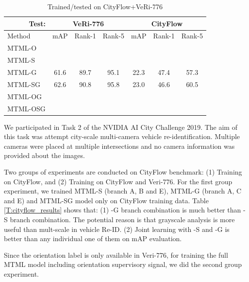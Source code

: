 \documentclass[10pt,twocolumn,letterpaper]{article}
\begin{document}
\begin{table}[h]
  \centering
  \setlength{\tabcolsep}{0.05cm}
  \begin{tabular}{l|c|c|c|c|c|c}
  \hline
  \multicolumn{1}{r|}{Test:} & \multicolumn{3}{c|}{VeRi-776} & \multicolumn{3}{c}{CityFlow} \\
  \hline
  Method       & mAP   & Rank-1  & Rank-5  & mAP   & Rank-1 & Rank-5  \\
  \hline
  MTML-O       &       &         &         &       &        &         \\
  MTML-S       &       &         &         &       &        &         \\
  MTML-G       & 61.6  & 89.7    & 95.1    & 22.3  & 47.4   & 57.3   \\
  MTML-SG      & 62.6  & 90.8    & 95.8    & 23.0  & 46.6   & 60.5   \\
  MTML-OG      &       &         &         &       &        &         \\
  MTML-OSG     &       &         &         &       &        &      \\
  \hline
  \end{tabular}
  \caption{Trained/tested on CityFlow+VeRi-776}
  \label{T:cf_veri_res}
\end{table}

We participated in Task 2 of the NVIDIA AI City Challenge 2019. The aim of this task was attempt city-scale multi-camera vehicle re-identification. Multiple cameras were placed at multiple intersections and no camera information was provided about the images.

Two groups of experiments are conducted on CityFlow benchmark: 
(1) Training on CityFlow, and (2) Training on CityFlow and Veri-776.
%
For the first group experiment, we trained MTML-S (branch A, B and E), 
MTML-G (branch A, C and E) and MTML-SG model only on CityFlow training data.
Table \ref{T:cityflow_results} shows that: 
(1) -G branch combination is much better than -S branch combination. 
The potential reason is that grayscale analysis is more useful than mult-scale in vehicle Re-ID.
(2) Joint learning with -S and -G is better than any individual one of them on mAP evaluation.

Since the orientation label is only available in Veri-776, 
for training the full MTML model including orientation supervisory signal,
we did the second group experiment.
%
\end{document}
